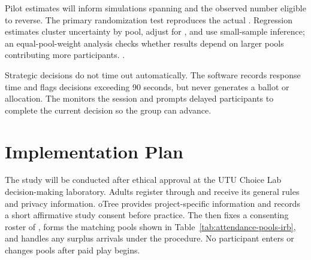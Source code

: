 \documentclass[11pt,a4paper]{article}
\begin{document}
Pilot estimates will inform simulations spanning  and the observed number eligible to reverse. The primary randomization test reproduces the actual . Regression estimates cluster uncertainty by pool, adjust for , and use small-sample inference; an equal-pool-weight analysis checks whether results depend on larger pools contributing more participants. . 

Strategic decisions do not time out automatically.  The software records response time and flags decisions exceeding 90 seconds, but never generates a ballot or allocation. The  monitors the session and prompts delayed participants to complete the current decision so the group can advance.

\FloatBarrier

\section{Implementation Plan}

The study will be conducted after ethical approval at the UTU Choice Lab decision-making laboratory. Adults register through  and receive its general rules and privacy information.  oTree provides project-specific information and records a short affirmative study consent before practice. The  then fixes a consenting roster of , forms the matching pools shown in Table~\ref{tab:attendance-pools-irb}, and handles any surplus arrivals under the  procedure. No participant enters or changes pools after paid play begins.
\end{document}
